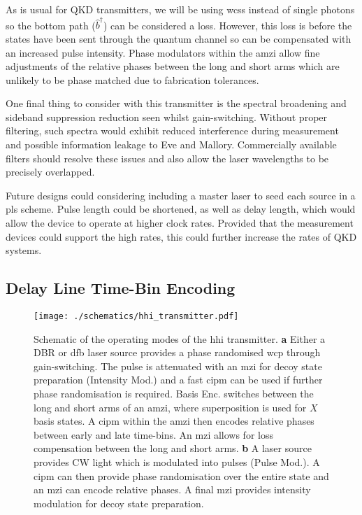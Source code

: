 As is usual for \ac{QKD} transmitters, we will be using \acp{wcs} instead of single photons so the bottom path ($\hat{b}^\dagger$) can be considered a loss. However, this loss is before the states have been sent through the quantum channel so can be compensated with an increased pulse intensity. Phase modulators within the \ac{amzi} allow fine adjustments of the relative phases between the long and short arms which are unlikely to be phase matched due to fabrication tolerances. 

One final thing to consider with this transmitter is the spectral broadening and sideband suppression reduction seen whilst gain-switching. Without proper filtering, such spectra would exhibit reduced interference during measurement and possible information leakage to Eve and Mallory. Commercially available filters should resolve these issues and also allow the laser wavelengths to be precisely overlapped.

Future designs could considering including a master laser to seed each source in a \ac{pls} scheme. Pulse length could be shortened, as well as delay length, which would allow the device to operate at higher clock rates. Provided that the measurement devices could support the high rates, this could further increase the rates of \ac{QKD} systems.

\subsection{Delay Line Time-Bin Encoding}

\begin{sidewaysfigure}
	\centering
	\texttt{[image: ./schematics/hhi\_transmitter.pdf]}
	\caption[Schematic of the HHI full transmitter]{Schematic of the operating modes of the \acs{hhi} transmitter. \textbf{a} Either a \acs{DBR} or \acs{dfb} laser source provides a phase randomised \acs{wcp} through gain-switching. The pulse is attenuated with an \acs{mzi} for decoy state preparation (Intensity Mod.) and a fast \acs{cipm} can be used if further phase randomisation is required. Basis Enc. switches between the long and short arms of an \acs{amzi}, where superposition is used for $X$ basis states. A \acs{cipm} within the \acs{amzi} then encodes relative phases between early and late time-bins. An \acs{mzi} allows for loss compensation between the long and short arms. \textbf{b} A laser source provides \acs{CW} light which is modulated into pulses (Pulse Mod.). A \acs{cipm} can then provide phase randomisation over the entire state and an \acs{mzi} can encode relative phases. A final \acs{mzi} provides intensity modulation for decoy state preparation.}
	\label{fig:hhi_transmitter}
\end{sidewaysfigure}

